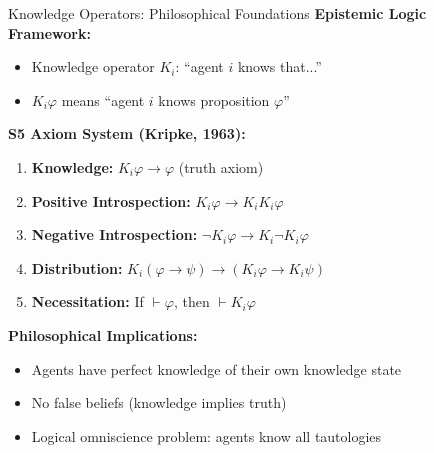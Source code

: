 \documentclass[xcolor={x11names}]{beamer}
\begin{document}
\begin{frame}{Knowledge Operators: Philosophical Foundations}
\textbf{Epistemic Logic Framework:}
\begin{itemize}
  \item Knowledge operator $K_i$: ``agent $i$ knows that...''
  \item $K_i \varphi$ means ``agent $i$ knows proposition $\varphi$''
\end{itemize}

\textbf{S5 Axiom System (Kripke, 1963):}
\begin{enumerate}
  \item \textbf{Knowledge:} $K_i \varphi \rightarrow \varphi$ (truth axiom)
  \item \textbf{Positive Introspection:} $K_i \varphi \rightarrow K_i K_i \varphi$
  \item \textbf{Negative Introspection:} $\neg K_i \varphi \rightarrow K_i \neg K_i \varphi$
  \item \textbf{Distribution:} $K_i(\varphi \rightarrow \psi) \rightarrow (K_i \varphi \rightarrow K_i \psi)$
  \item \textbf{Necessitation:} If $\vdash \varphi$, then $\vdash K_i \varphi$
\end{enumerate}

\textbf{Philosophical Implications:}
\begin{itemize}
  \item Agents have perfect knowledge of their own knowledge state
  \item No false beliefs (knowledge implies truth)
  \item Logical omniscience problem: agents know all tautologies
\end{itemize}
\end{frame}
\end{document}
